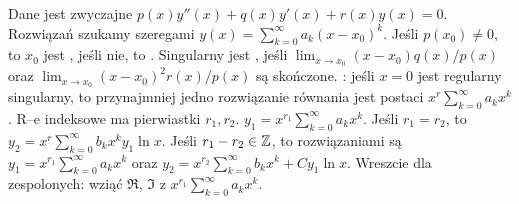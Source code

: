 
\renewcommand{\footrulewidth}{0.4pt}


















\newpage







Dane  jest zwyczajne $p(x) y''(x) + q(x) y'(x) + r(x) y(x) = 0$. %
Rozwiązań szukamy szeregami $y(x) = \sum_{k=0}^\infty a_k(x-x_0)^k$.
Jeśli $p(x_0)\neq 0$, to $x_0$ jest , jeśli nie, to .
Singularny jest , jeśli $\lim_{x \to x_0} (x-x_0)q(x) / p(x)$ oraz $\lim_{x \to x_0} (x-x_0)^2 r(x) / p(x)$ są skończone.
: jeśli $x = 0$ jest regularny singularny, to przynajmniej jedno rozwiązanie równania jest postaci $x^r \sum_{k=0}^\infty a_k x^k$.
R--e indeksowe ma pierwiastki $r_1, r_2$.
$y_1 = x^{r_1} \sum_{k=0}^\infty a_k x^k$.
Jeśli $r_1 = r_2$, to $y_2 = x^r \sum_{k=0}^\infty b_kx^k y_1 \ln x$.
Jeśli $r_1 - r_2 \in \mathbb{Z}$, to rozwiązaniami są $y_1 = x^{r_1} \sum_{k=0}^\infty a_kx^k$ oraz $y_2 = x^{r_2} \sum_{k=0}^\infty b_k x^k + C y_1 \ln x$.
Wreszcie dla zespolonych: wziąć $\Re$, $\Im$ z $x^{r_1} \sum_{k=0}^\infty a_k x^k$.

